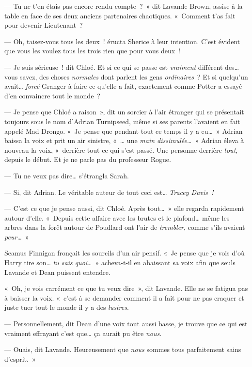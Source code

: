 --- Tu ne t'en étais pas encore rendu compte~?~» dit Lavande Brown, assise à la table en face de ses deux anciens partenaires chaotiques. «~Comment t'as fait pour devenir Lieutenant~?

--- Oh, taisez-vous tous les deux~! éructa Sherice à leur intention. C'est évident que vous les voulez tous les trois rien que pour vous deux~!

--- Je suis sérieuse~! dit Chloé. Et si ce qui se passe est \emph{vraiment} différent des… vous savez, des choses \emph{normales} dont parlent les gens \emph{ordinaires}~? Et si quelqu'un avait… \emph{forcé} Granger à faire ce qu'elle a fait, exactement comme Potter a essayé d'en convaincre tout le monde~?

--- Je pense que Chloé a raison~», dit un sorcier à l'air étranger qui se présentait toujours sous le nom d'Adrian Turnipseed, même si ses parents l'avaient en fait appelé Mad Drongo. «~Je pense que pendant tout ce temps il y a eu…~» Adrian baissa la voix et prit un air sinistre, «~… une \emph{main dissimulée}…~» Adrian éleva à nouveau la voix, «~derrière tout ce qui s'est passé. Une personne derrière \emph{tout}, depuis le début. Et je ne parle pas du professeur Rogue.

--- Tu ne veux pas dire… s'étrangla Sarah.

--- Si, dit Adrian. Le véritable auteur de tout ceci est… \emph{Tracey Davis~!}

--- C'est ce que je pense aussi, dit Chloé. Après tout…~» elle regarda rapidement autour d'elle. «~Depuis cette affaire avec les brutes et le plafond… même les arbres dans la forêt autour de Poudlard ont l'air de \emph{trembler}, comme s'ils avaient \emph{peur…}~»

Seamus Finnigan fronçait les sourcils d'un air pensif. «~Je pense que je vois d'où Harry tire son… \emph{tu sais quoi}…~» acheva-t-il en abaissant sa voix afin que seuls Lavande et Dean puissent entendre.

«~Oh, je vois carrément ce que tu veux dire~», dit Lavande. Elle ne se fatigua pas à baisser la voix. «~c'est à se demander comment il a fait pour ne pas craquer et juste tuer tout le monde il y a des \emph{lustres}.

--- Personnellement, dit Dean d'une voix tout aussi basse, je trouve que ce qui est vraiment effrayant c'est que… ça aurait pu être \emph{nous}.

--- Ouais, dit Lavande. Heureusement que \emph{nous} sommes tous parfaitement sains d'esprit.~»

